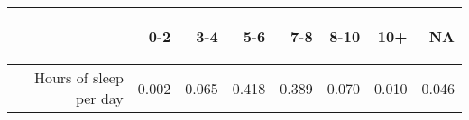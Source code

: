 \documentclass{article}\usepackage[]{graphicx}\usepackage[]{color}
\begin{document}
\begin{table}[ht]
\centering
\begin{tabular}{rrrrrrrr}
  \hline
 & \begin{sideways} 0-2 \end{sideways} & \begin{sideways} 3-4 \end{sideways} & \begin{sideways} 5-6 \end{sideways} & \begin{sideways} 7-8 \end{sideways} & \begin{sideways} 8-10 \end{sideways} & \begin{sideways} 10+ \end{sideways} & \begin{sideways} NA \end{sideways} \\ 
  \hline
Hours of sleep per day & 0.002 & 0.065 & 0.418 & 0.389 & 0.070 & 0.010 & 0.046 \\ 
   \hline
\end{tabular}
\end{table}
\end{document}
